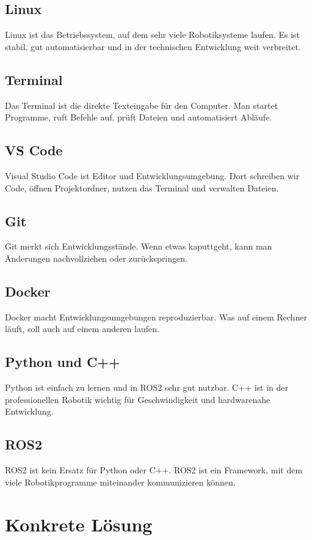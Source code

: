 \subsection{Linux}
Linux ist das Betriebssystem, auf dem sehr viele Robotiksysteme laufen. Es ist
stabil, gut automatisierbar und in der technischen Entwicklung weit verbreitet.

\subsection{Terminal}
Das Terminal ist die direkte Texteingabe für den Computer. Man startet Programme,
ruft Befehle auf, prüft Dateien und automatisiert Abläufe.

\subsection{VS Code}
Visual Studio Code ist Editor und Entwicklungsumgebung. Dort schreiben wir
Code, öffnen Projektordner, nutzen das Terminal und verwalten Dateien.

\subsection{Git}
Git merkt sich Entwicklungsstände. Wenn etwas kaputtgeht, kann man Änderungen
nachvollziehen oder zurückspringen.

\subsection{Docker}
Docker macht Entwicklungsumgebungen reproduzierbar. Was auf einem Rechner
läuft, soll auch auf einem anderen laufen.

\subsection{Python und C++}
Python ist einfach zu lernen und in ROS2 sehr gut nutzbar. C++ ist in der
professionellen Robotik wichtig für Geschwindigkeit und hardwarenahe Entwicklung.

\subsection{ROS2}
ROS2 ist kein Ersatz für Python oder C++. ROS2 ist ein Framework, mit dem
viele Robotikprogramme miteinander kommunizieren können.

\section{Konkrete Lösung}

